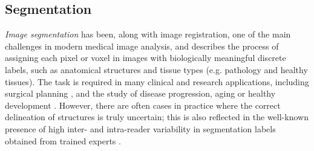 %

\subsection*{Segmentation}
\textit{Image segmentation} has been, along with image registration, one of the main challenges in modern medical image analysis, and describes the process of assigning each pixel or voxel in images with biologically meaningful discrete labels, such as anatomical structures and tissue types (e.g. pathology and healthy tissues). The task is required in many clinical and research applications, including surgical planning \cite{gering2001integrated,mazzara2004brain}, and the study of disease progression, aging or healthy development \cite{fischl2002whole,prastawa2005automatic,zijdenbos2002automatic}. However, there are often cases in practice where the correct delineation of structures is truly uncertain; this is also reflected in the well-known presence of high inter- and intra-reader variability in segmentation labels obtained from trained experts \cite{warfield2004simultaneous,joskowicz2018automatic,joskowicz2019inter}. 

